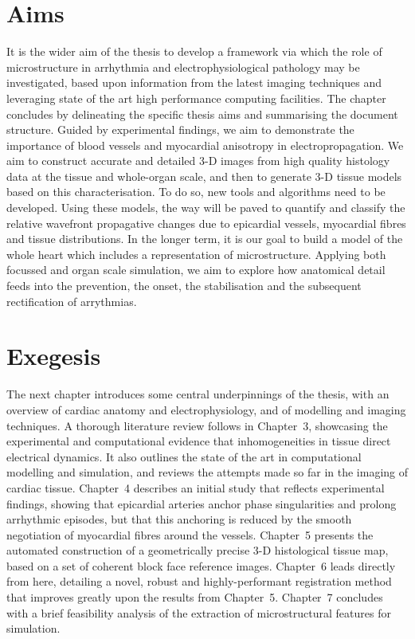 \section{Aims}
\label{sec:intro:aims}
It is the wider aim of the thesis to develop a framework via which the role of microstructure in arrhythmia and electrophysiological pathology may be investigated, based upon information from the latest imaging techniques and leveraging state of the art high performance computing facilities. The chapter concludes by delineating the specific thesis aims and summarising the document structure. Guided by experimental findings, we aim to demonstrate the importance of blood vessels and myocardial anisotropy in electropropagation. We aim to construct accurate and detailed 3-D images from high quality histology data at the tissue and whole-organ scale, and then to generate 3-D tissue models based on this characterisation. To do so, new tools and algorithms need to be developed. Using these models, the way will be paved to quantify and classify the relative wavefront propagative changes due to epicardial vessels, myocardial fibres and tissue distributions. In the longer term, it is our goal to build a model of the whole heart which includes a representation of microstructure. Applying both focussed and organ scale simulation, we aim to explore how anatomical detail feeds into the prevention, the onset, the stabilisation and the subsequent rectification of arrythmias.

\section{Exegesis}
\label{sec:intro:exegesis}
  The next chapter introduces some central underpinnings of the thesis, with an overview of cardiac anatomy and electrophysiology, and of modelling and imaging techniques. A thorough literature review follows in Chapter~3, showcasing the experimental and computational evidence that inhomogeneities in tissue direct electrical dynamics. It also outlines the state of the art in computational modelling and simulation, and reviews the attempts made so far in the imaging of cardiac tissue. Chapter~4 describes an initial study that reflects experimental findings, showing that epicardial arteries anchor phase singularities and prolong arrhythmic episodes, but that this anchoring is reduced by the smooth negotiation of myocardial fibres around the vessels. Chapter~5 presents the automated construction of a geometrically precise 3-D histological tissue map, based on a set of coherent block face reference images. Chapter~6 leads directly from here, detailing a novel, robust and highly-performant registration method that improves greatly upon the results from Chapter~5. Chapter~7 concludes with a brief feasibility analysis of the extraction of microstructural features for simulation.

